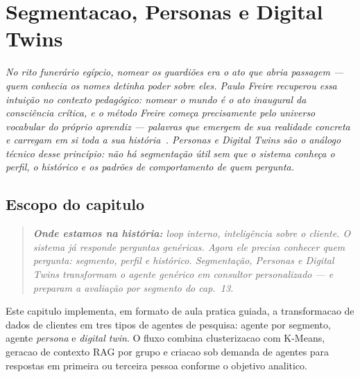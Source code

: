 \chapter{Segmentacao, Personas e Digital Twins}
\label{chap:segmentacao_personas_twins}

{\small\itshape\color{AccentGray}
No rito funer\'{a}rio eg\'{i}pcio, nomear os guardi\~{o}es era o ato que abria passagem --- quem conhecia os nomes detinha poder sobre eles. Paulo Freire recuperou essa intui\c{c}\~{a}o no contexto pedag\'{o}gico: nomear o mundo \'{e} o ato inaugural da consci\^{e}ncia cr\'{i}tica, e o m\'{e}todo Freire come\c{c}a precisamente pelo \textit{universo vocabular} do pr\'{o}prio aprendiz --- palavras que emergem de sua realidade concreta e carregam em si toda a sua hist\'{o}ria~\cite{freire1968pedagogia}. Personas e \textit{Digital Twins} s\~{a}o o an\'{a}logo t\'{e}cnico desse princ\'{i}pio: n\~{a}o h\'{a} segmenta\c{c}\~{a}o \'{u}til sem que o sistema conhe\c{c}a o perfil, o hist\'{o}rico e os padr\~{o}es de comportamento de quem pergunta.\par}
\vspace{0.6em}
\section{Escopo do capitulo}

\begin{quote}\itshape
\textbf{Onde estamos na hist\'oria:} loop interno, intelig\^encia sobre o cliente.
O sistema j\'a responde perguntas gen\'ericas. Agora ele precisa conhecer
quem pergunta: segmento, perfil e hist\'orico. Segmenta\c{c}\~ao, Personas
e Digital Twins transformam o agente gen\'erico em consultor personalizado
--- e preparam a avalia\c{c}\~ao por segmento do cap.~13.
\end{quote}

Este capitulo implementa, em formato de aula pratica guiada, a transformacao
de dados de clientes em tres tipos de agentes de pesquisa: agente por
segmento, agente \textit{persona} e
\textit{digital twin}. O fluxo combina
clusterizacao com K-Means,
geracao de contexto RAG por grupo e criacao sob demanda de agentes para
respostas em primeira ou terceira pessoa conforme o objetivo analitico.

